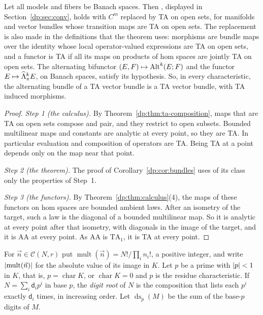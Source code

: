 \begin{corollary}\label{dp:cor:ta-bundles}
Let all models and fibers be Banach spaces. Then \cite[Theorem~2.1]{I}, displayed in Section~\ref{dp:sec:conv}, holds with $C^m$ replaced by TA on open sets, for manifolds and vector bundles whose transition maps are TA on open sets. The replacement is also made in the definitions that the theorem uses: morphisms are bundle maps over the identity whose local operator-valued expressions are TA on open sets, and a functor is TA if all its maps on products of hom spaces are jointly TA on open sets. The alternating bifunctor $(E,F)\mapsto\operatorname{Alt}^k(E;F)$ and the functor $E\mapsto\widehat\Lambda^k_\pi E$, on Banach spaces, satisfy its hypothesis. So, in every characteristic, the alternating bundle of a TA vector bundle is a TA vector bundle, with TA induced morphisms.
\end{corollary}

\begin{proof}
\emph{Step 1 (the calculus).} By Theorem~\ref{dp:thm:ta-composition}, maps that are TA on open sets compose and pair, and they restrict to open subsets. Bounded multilinear maps and constants are analytic at every point, so they are TA. In particular evaluation and composition of operators are TA. Being TA at a point depends only on the map near that point.

\emph{Step 2 (the theorem).} The proof of Corollary~\ref{dp:cor:bundles} uses of its class only the properties of Step~1.

\emph{Step 3 (the functors).} By Theorem~\ref{dp:thm:calculus}(4), the maps of these functors on hom spaces are bounded ambient laws. After an isometry of the target, such a law is the diagonal of a bounded multilinear map. So it is analytic at every point after that isometry, with diagonals in the image of the target, and it is AA at every point. As AA is $\mathrm{TA}_1$, it is TA at every point.
\end{proof}

For $\vec n\in\mathcal C(N,r)$ put $\operatorname{mult}(\vec n)=N!/\prod_in_i!$, a positive integer, and write $\lvert \operatorname{mult}(\vec n)\rvert$ for the absolute value of its image in $K$. Let $p$ be a prime with $\lvert p\rvert<1$ in $K$, that is, $p=\operatorname{char}K$, or $\operatorname{char}K=0$ and $p$ is the residue characteristic. If $N=\sum_i\mathsf d_ip^i$ in base $p$, the \emph{digit root} of $N$ is the composition that lists each $p^i$ exactly $\mathsf d_i$ times, in increasing order. Let $\operatorname{ds}_p(M)$ be the sum of the base-$p$ digits of $M$.

